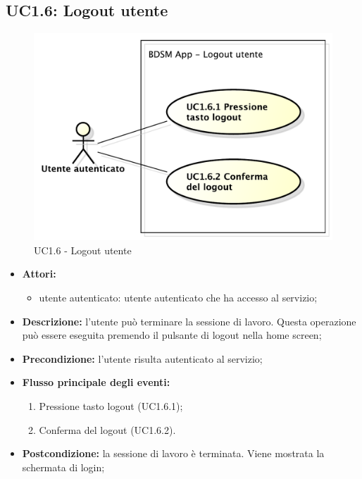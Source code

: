 \pagebreak


\subsection{UC1.6: Logout utente}
\begin{figure}[htbp]
	\centering
	\centerline{\includegraphics[scale=0.45]{./images/UC1_6.pdf}}
	\caption{UC1.6 - Logout utente}
\end{figure}

\begin{itemize}
	\item \textbf{Attori:}
	\begin{itemize}
		\item utente autenticato: utente autenticato che ha accesso al servizio;
	\end{itemize}
	\item \textbf{Descrizione:} l'utente può terminare la sessione di lavoro. Questa operazione può essere eseguita premendo il pulsante di logout nella home screen;
	\item \textbf{Precondizione:} l'utente risulta autenticato al servizio;
	\item \textbf{Flusso principale degli eventi:}
	\begin{enumerate}
		\item Pressione tasto logout (UC1.6.1);
		\item Conferma del logout (UC1.6.2).
	\end{enumerate}
	\item \textbf{Postcondizione:} la sessione di lavoro è terminata. Viene mostrata la schermata di login;
\end{itemize}

